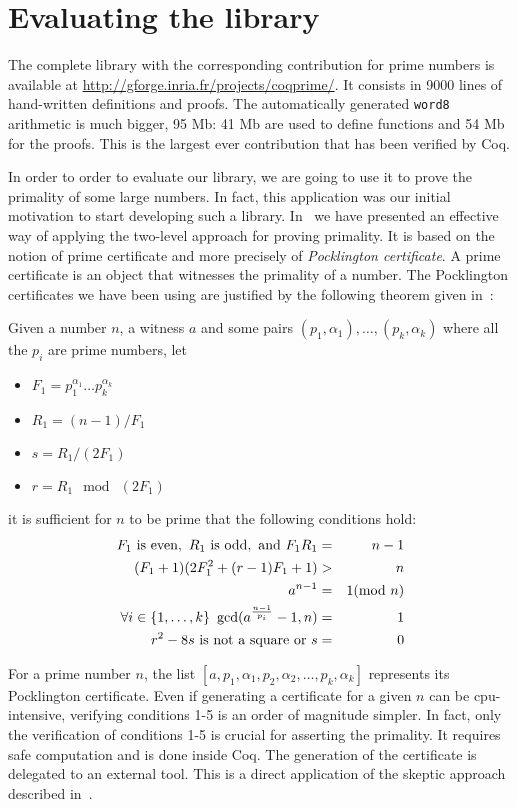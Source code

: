 \section{Evaluating the library \label{bench}}

The complete library with the corresponding contribution for prime numbers is available at \url{http://gforge.inria.fr/projects/coqprime/}. It consists in 9000 lines of hand-written
definitions and proofs. The automatically generated {\tt word8} arithmetic is much bigger,
95 Mb: 41 Mb are used to define functions and 54 Mb for the proofs. This is the largest ever
contribution that has been verified by {\sc Coq}. 

In order to order to evaluate our library, we are going to use it to prove the
primality of some large numbers. In fact, this application was our initial motivation 
to start developing such a library.
In~\cite{GreTheWer} we have presented an effective way of applying 
the two-level approach for proving primality. It is based on the
notion of prime certificate and more precisely of {\it Pocklington certificate}.
A prime certificate is an object that witnesses the primality of a number.
The Pocklington certificates we have been using are justified by the following
theorem given in~\cite{lehmer}:
\begin{theorem}\label{lehmer}
Given a number $n$, a witness $a$ and some pairs $(p_1,\alpha_1),\dots,(p_k,\alpha_k)$
 where all the $p_i$ are prime numbers,
 let
 \begin{itemize}
\item[]$F_1 = p_1^{\alpha_1}\dots p_k^{\alpha_k}$
\item[]$R_1 = (n - 1) / F_1$
\item[]$ s = R_1 / (2F_1)$
\item[] $r = R_1 \mod\ (2F_1)$
 \end{itemize}
 it is sufficient for $n$ to be prime that the following conditions hold:
\begin{eqnarray}
F_1 \,\,\hbox{is even},\,\,
R_1 \,\, \hbox{is odd}, \,\,\hbox{and}\,\,
F_1R_1  &=&  n -1\\
(F_1 + 1) (2F_1^2 + (r - 1) F_1 + 1) & >& n\\
a^{n-1} &=& 1 (\mod\ n)\\
\forall i\in\{1,\dots,k\}~\gcd(a^{\frac{n-1}{p_i}}-1,n)&=&1\\
r^2 - 8 s\,\,\mbox{is not a square}\,\,\hbox{or}\,\,s &=& 0
\end{eqnarray}
\end{theorem}
For a prime number $n$, the list $[a, p_1, \alpha_1, p_2, \alpha_2, \dots, p_k, \alpha_k]$
represents its Pocklington certificate.
Even if generating a certificate for a given $n$ can be cpu-intensive, verifying
conditions 1-5 is an order of magnitude simpler. In fact, only
the verification of conditions 1-5 is crucial for asserting the primality. It requires
safe computation and is done inside {\sc Coq}.
The generation of the certificate is delegated to an external tool.
This is a direct application of the skeptic approach described in~\cite{BarBar,HarThe}.
                 
